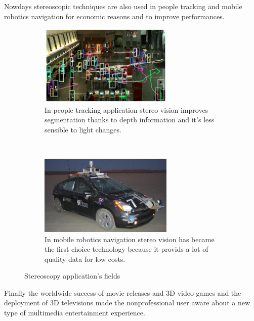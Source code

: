 Nowdays stereoscopic techniques are also used in people tracking and mobile robotics
navigation for economic reasons and to improve performances.\\
\begin{figure}[h!]
\centering
\begin{subfigure}[]{0.5\textwidth}
		\centering
        \includegraphics[width=0.7\textwidth]{./img/tracking.jpg}
                \caption{\scriptsize{In people tracking application stereo vision improves segmentation thanks to depth information and it's less sensible to light changes.}}
\end{subfigure}%
~ \quad
\begin{subfigure}[]{0.5\textwidth}
		\centering
        \includegraphics[width=0.7\textwidth]{./img/little_ben.jpg}
                \caption{\scriptsize{In mobile robotics navigation stereo vision has became the first choice technology because it provids a lot of quality data for low costs.}}
\end{subfigure} 
\caption{\small{Stereoscopy application's fields}}
\end{figure}
Finally the worldwide success of movie releases and  3D video games and the deployment of 3D televisions made the nonprofessional user aware about a new type of multimedia entertainment experience.\\

